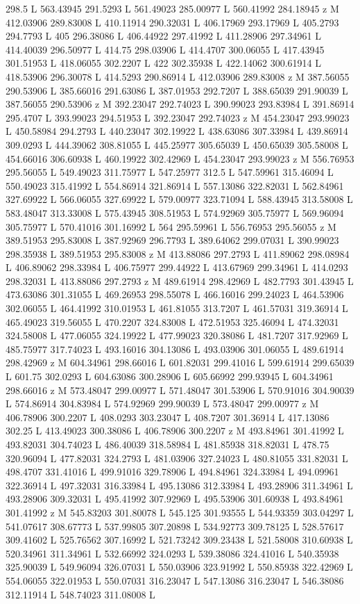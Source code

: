 {\begin{scope}[local bounding box=bb]
{298.5 L 563.43945 291.5293 L 561.49023 285.00977 L 560.41992 284.18945 z M 412.03906 289.83008 L 410.11914 290.32031 L 406.17969 293.17969 L 405.2793 294.7793 L 405 296.38086 L 406.44922 297.41992 L 411.28906 297.34961 L 414.40039 296.50977 L 414.75 298.03906 L 414.4707 300.06055 L 417.43945 301.51953 L 418.06055 302.2207 L 422 302.35938 L 422.14062 300.61914 L 418.53906 296.30078 L 414.5293 290.86914 L 412.03906 289.83008 z M 387.56055 290.53906 L 385.66016 291.63086 L 387.01953 292.7207 L 388.65039 291.90039 L 387.56055 290.53906 z M 392.23047 292.74023 L 390.99023 293.83984 L 391.86914 295.4707 L 393.99023 294.51953 L 392.23047 292.74023 z M 454.23047 293.99023 L 450.58984 294.2793 L 440.23047 302.19922 L 438.63086 307.33984 L 439.86914 309.0293 L 444.39062 308.81055 L 445.25977 305.65039 L 450.65039 305.58008 L 454.66016 306.60938 L 460.19922 302.42969 L 454.23047 293.99023 z M 556.76953 295.56055 L 549.49023 311.75977 L 547.25977 312.5 L 547.59961 315.46094 L 550.49023 315.41992 L 554.86914 321.86914 L 557.13086 322.82031 L 562.84961 327.69922 L 566.06055 327.69922 L 579.00977 323.71094 L 588.43945 313.58008 L 583.48047 313.33008 L 575.43945 308.51953 L 574.92969 305.75977 L 569.96094 305.75977 L 570.41016 301.16992 L 564 295.59961 L 556.76953 295.56055 z M 389.51953 295.83008 L 387.92969 296.7793 L 389.64062 299.07031 L 390.99023 298.35938 L 389.51953 295.83008 z M 413.88086 297.2793 L 411.89062 298.08984 L 406.89062 298.33984 L 406.75977 299.44922 L 413.67969 299.34961 L 414.0293 298.32031 L 413.88086 297.2793 z M 489.61914 298.42969 L 482.7793 301.43945 L 473.63086 301.31055 L 469.26953 298.55078 L 466.16016 299.24023 L 464.53906 302.06055 L 464.41992 310.01953 L 461.81055 313.7207 L 461.57031 319.36914 L 465.49023 319.56055 L 470.2207 324.83008 L 472.51953 325.46094 L 474.32031 324.58008 L 477.06055 324.19922 L 477.99023 320.38086 L 481.7207 317.92969 L 485.75977 317.74023 L 493.16016 304.13086 L 493.03906 301.06055 L 489.61914 298.42969 z M 604.34961 298.66016 L 601.82031 299.41016 L 599.61914 299.65039 L 601.75 302.0293 L 604.63086 300.28906 L 605.66992 299.93945 L 604.34961 298.66016 z M 573.48047 299.00977 L 571.48047 301.53906 L 570.91016 304.90039 L 574.86914 304.83984 L 574.92969 299.90039 L 573.48047 299.00977 z M 406.78906 300.2207 L 408.0293 303.23047 L 408.7207 301.36914 L 417.13086 302.25 L 413.49023 300.38086 L 406.78906 300.2207 z M 493.84961 301.41992 L 493.82031 304.74023 L 486.40039 318.58984 L 481.85938 318.82031 L 478.75 320.96094 L 477.82031 324.2793 L 481.03906 327.24023 L 480.81055 331.82031 L 498.4707 331.41016 L 499.91016 329.78906 L 494.84961 324.33984 L 494.09961 322.36914 L 497.32031 316.33984 L 495.13086 312.33984 L 493.28906 311.34961 L 493.28906 309.32031 L 495.41992 307.92969 L 495.53906 301.60938 L 493.84961 301.41992 z M 545.83203 301.80078 L 545.125 301.93555 L 544.93359 303.04297 L 541.07617 308.67773 L 537.99805 307.20898 L 534.92773 309.78125 L 528.57617 309.41602 L 525.76562 307.16992 L 521.73242 309.23438 L 521.58008 310.60938 L 520.34961 311.34961 L 532.66992 324.0293 L 539.38086 324.41016 L 540.35938 325.90039 L 549.96094 326.07031 L 550.03906 323.91992 L 550.85938 322.42969 L 554.06055 322.01953 L 550.07031 316.23047 L 547.13086 316.23047 L 546.38086 312.11914 L 548.74023 311.08008 L }
\end{scope}}
